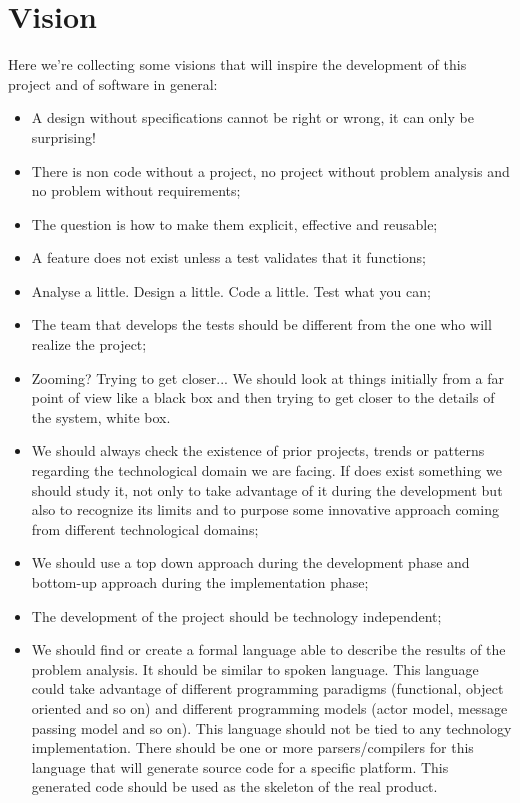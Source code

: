 \section{Vision}
Here we’re collecting some visions that will inspire the development of this project and of software in general:
\begin{itemize}
	\item A design without specifications cannot be right or wrong, it can only be surprising!
	\item There is non code without a project, no project without problem analysis and no problem without requirements;
	\item The question is how to make them explicit, effective and reusable;
	\item A feature does not exist unless a test validates that it functions;
	\item Analyse a little. Design a little. Code a little. Test what you can;
	\item The team that develops the tests should be different from the one who will realize the project;
	\item Zooming? Trying to get closer... We should look at things initially from a far point of view like a black box and then trying to get closer to the details of the system, white box.
	\item We should always check the existence of prior projects, trends or patterns regarding the technological domain we are facing. If does exist something we should study it, not only to take advantage of it during the development but also to recognize its limits and to purpose some innovative approach coming from different technological domains;
	\item We should use a top down approach during the development phase and bottom-up approach during the implementation phase;
	\item The development of the project should be technology independent;
	\item We should find or create a formal language able to describe the results of the problem analysis. It should be similar to spoken language. This language could take advantage of different programming paradigms (functional, object oriented and so on) and different programming models (actor model, message passing model and so on). This language should not be tied to any technology implementation. There should be one or more parsers/compilers for this language that will generate source code for a specific platform. This generated code should be used as the skeleton of the real product.
\end{itemize}